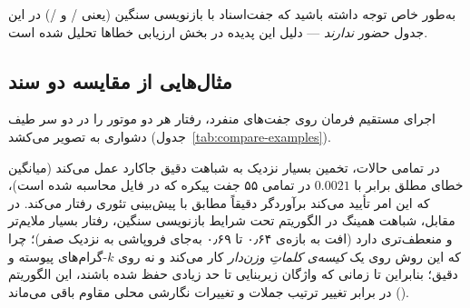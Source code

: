 \documentclass[11pt,a4paper]{article}
\begin{document}
	
	به‌طور خاص توجه داشته باشید که جفت‌اسناد با بازنویسی سنگین (یعنی / و /) در این جدول حضور \emph{ندارند} — دلیل این پدیده در بخش ارزیابی خطاها تحلیل شده است.
	
	\subsection{مثال‌هایی از مقایسه دو سند}
	
	اجرای مستقیم فرمان  روی جفت‌های منفرد، رفتار هر دو موتور را در دو سر طیف دشواری به تصویر می‌کشد (جدول~\ref{tab:compare-examples}).
	
\begin{table}[H]
	\centering
	\caption{Output of the \texttt{compare} command for four sample document pairs.}
	\label{tab:compare-examples}
\end{table}


	
	در تمامی حالات، تخمین  بسیار نزدیک به شباهت دقیق جاکارد عمل می‌کند (میانگین خطای مطلق برابر با $0.0021$ در تمامی ۵۵ جفت پیکره که در فایل  محاسبه شده است)، که این امر تأیید می‌کند برآوردگر دقیقاً مطابق با پیش‌بینی تئوری رفتار می‌کند. در مقابل، شباهت همینگ در الگوریتم  تحت شرایط بازنویسی سنگین، رفتار بسیار ملایم‌تر و منعطف‌تری دارد (افت به بازه‌ی ۰٫۶۴ تا ۰٫۶۹ به‌جای فروپاشی به نزدیک صفر)؛ چرا که این روش روی یک \emph{کیسه‌ی کلماتِ وزن‌دار} کار می‌کند و نه روی $k$-گرام‌های پیوسته و دقیق؛ بنابراین تا زمانی که واژگان زیربنایی تا حد زیادی حفظ شده باشند، این الگوریتم در برابر تغییر ترتیب جملات و تغییرات نگارشی محلی مقاوم باقی می‌ماند ().
	
\end{document}
